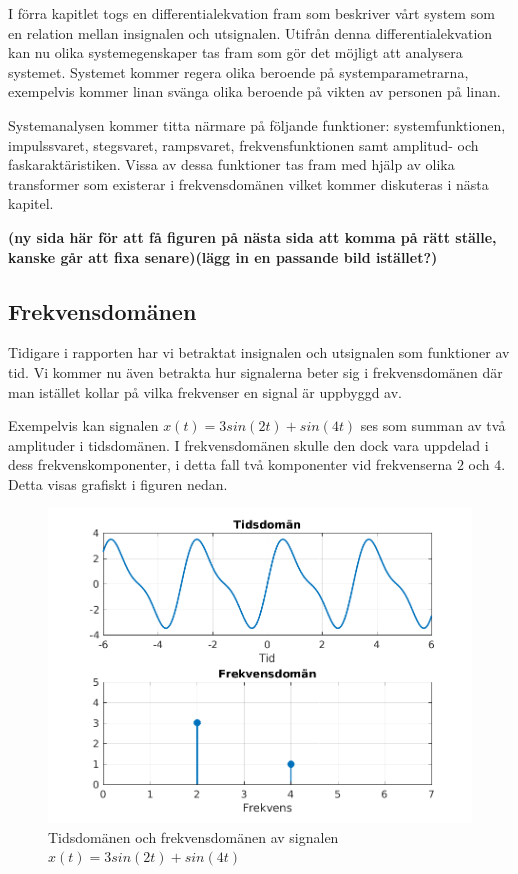 I förra kapitlet togs en differentialekvation fram som beskriver vårt system som en relation mellan insignalen och utsignalen. Utifrån denna differentialekvation kan nu olika systemegenskaper tas fram som gör det möjligt att analysera systemet. Systemet kommer regera olika beroende på systemparametrarna, exempelvis kommer linan svänga olika beroende på vikten av personen på linan. 

Systemanalysen kommer titta närmare på följande funktioner: systemfunktionen, impulssvaret, stegsvaret, rampsvaret, frekvensfunktionen samt amplitud- och faskaraktäristiken.
Vissa av dessa funktioner tas fram med hjälp av olika transformer som existerar i frekvensdomänen vilket kommer diskuteras i nästa kapitel.

\textbf{(ny sida här för att få figuren på nästa sida att komma på rätt ställe, kanske går att fixa senare)(lägg in en passande bild istället?)}

\newpage
\subsection{Frekvensdomänen}
Tidigare i rapporten har vi betraktat insignalen och utsignalen som funktioner av tid. Vi kommer nu även betrakta hur signalerna beter sig i frekvensdomänen där man istället kollar på vilka frekvenser en signal är uppbyggd av.

Exempelvis kan signalen $x(t)=3sin(2t) + sin(4t)$ ses som summan av två amplituder i tidsdomänen. I frekvensdomänen skulle den dock vara uppdelad i dess frekvenskomponenter, i detta fall två komponenter vid frekvenserna $2$ och $4$. Detta visas grafiskt i figuren nedan.

\begin{figure}[h] %
    \centering
    \includegraphics{bilder/tid_vs_frekvens_exempel}
    \caption{Tidsdomänen och frekvensdomänen av signalen $x(t)=3sin(2t)+sin(4t)$}
    \label{fig:tid_vs_frekvens_exempel}
\end{figure}

